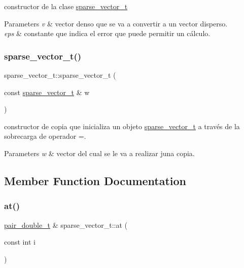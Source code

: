 constructor de la clase \hyperlink{classsparse__vector__t}{sparse\+\_\+vector\+\_\+t} 


\begin{DoxyParams}{Parameters}
{\em v} & vector denso que se va a convertir a un vector disperso. \\
\hline
{\em eps} & constante que indica el error que puede permitir un cálculo. \\
\hline
\end{DoxyParams}
\mbox{\label{classsparse__vector__t_a94f58b310542bbd9f781c6667fb89d06}} 
\subsubsection{\texorpdfstring{sparse\+\_\+vector\+\_\+t()}{sparse\_vector\_t()}\hspace{0.1cm}{\footnotesize\ttfamily [2/2]}}
{\footnotesize\ttfamily sparse\+\_\+vector\+\_\+t\+::sparse\+\_\+vector\+\_\+t (\begin{DoxyParamCaption}\item[{const \hyperlink{classsparse__vector__t}{sparse\+\_\+vector\+\_\+t} \&}]{w }\end{DoxyParamCaption})}



constructor de copia que inicializa un objeto \hyperlink{classsparse__vector__t}{sparse\+\_\+vector\+\_\+t} a través de la sobrecarga de operador =. 


\begin{DoxyParams}{Parameters}
{\em w} & vector del cual se le va a realizar juna copia. \\
\hline
\end{DoxyParams}


\subsection{Member Function Documentation}
\mbox{\label{classsparse__vector__t_a060ab319f62aa0a6dd711f9d87d990f3}} 
\subsubsection{\texorpdfstring{at()}{at()}\hspace{0.1cm}{\footnotesize\ttfamily [1/2]}}
{\footnotesize\ttfamily \hyperlink{classpair__t}{pair\+\_\+double\+\_\+t} \& sparse\+\_\+vector\+\_\+t\+::at (\begin{DoxyParamCaption}\item[{const int}]{i }\end{DoxyParamCaption})}



